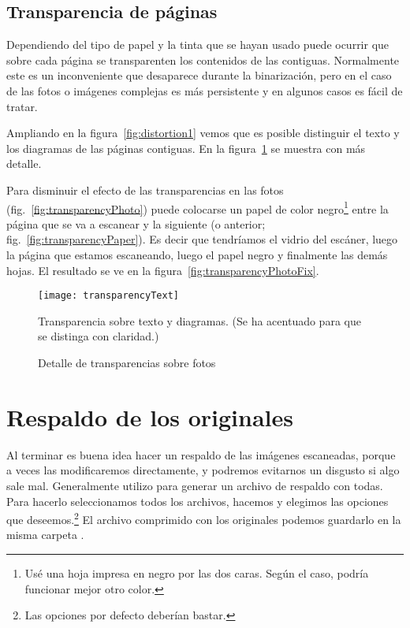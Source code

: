 \documentclass[%
	a5paper,
	10pt,
	twoside,
	openright,
	final,
]{memoir}
\begin{document}
{	\subsection{Transparencia de páginas} Dependiendo del tipo de papel y la tinta que se hayan usado puede ocurrir que sobre cada página se transparenten los contenidos de las contiguas. Normalmente este es un inconveniente que desaparece durante la binarización, pero en el caso de las fotos o imágenes complejas es más persistente y en algunos casos es fácil de tratar.

	Ampliando en la figura~\ref{fig:distortion1} vemos que es posible distinguir el texto y los diagramas de las páginas contiguas. En la figura~\ref{fig:transparencyText} se muestra con más detalle.

	Para disminuir el efecto de las transparencias en las fotos (fig.~\ref{fig:transparencyPhoto}) puede colocarse un papel de color negro\footnote{Usé una hoja impresa en negro por las dos caras. Según el caso, podría funcionar mejor otro color.} entre la página que se va a escanear y la siguiente (o anterior; fig.~\ref{fig:transparencyPaper}). Es decir que tendríamos el vidrio del escáner, luego la página que estamos escaneando, luego el papel negro y finalmente las demás hojas. El resultado se ve en la figura~\ref{fig:transparencyPhotoFix}.

	\begin{figure}
		\texttt{[image: transparencyText]}
		\caption[Transparencia sobre texto y diagramas]{Transparencia sobre texto y diagramas. (Se ha acentuado para que se distinga con claridad.)\label{fig:transparencyText}}
	\end{figure}

	\begin{figure}
		\vspace{-1.11\onelineskip}
		\caption{Detalle de transparencias sobre fotos\label{fig:transparency}}
	\end{figure}

	\section{Respaldo de los originales\label{sec:scanOriginalBackup}} Al terminar es buena idea hacer un respaldo de las imágenes escaneadas, porque a veces las modificaremos directamente, y podremos evitarnos un disgusto si algo sale mal. Generalmente utilizo \szip para generar un archivo de respaldo con todas. Para hacerlo seleccionamos todos los archivos, hacemos  y elegimos las opciones que deseemos.\footnote{Las opciones por defecto deberían bastar.} El archivo comprimido con los originales podemos guardarlo en la misma carpeta .

}
\end{document}
